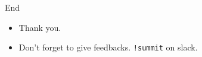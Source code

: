 \documentclass{beamer}
\begin{document}
\begin{frame}{End}
\begin{itemize}
\item Thank you.
\item Don't forget to give feedbacks. \texttt{!summit} on slack.
\end{itemize}
\end{frame}
\end{document}
